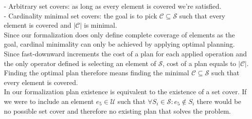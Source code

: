 \documentclass[11pt,a4paper]{article}
\begin{document}
- Arbitrary set covers: as long as every element is covered we're satisfied.\\
- Cardinality minimal set covers: the goal is to pick $\mathcal{C} \subseteq \mathcal{S}$ such that every element is covered and $|\mathcal{C}|$ is minimal.\\
Since our formalization does only define complete coverage of elements as the goal, cardinal minimality can only be achieved by applying optimal planning. Since fast-downward increments the cost of a plan for each applied operation and the only operator defined is selecting an element of $\mathcal{S}$, cost of a plan equals to $|\mathcal{C}|$. Finding the optimal plan therefore means finding the minimal $\mathcal{C} \subseteq \mathcal{S}$ such that every element is covered.\\
In our formalization plan existence is equivalent to the existence of a set cover. If we were to include an element $e_5 \in \mathcal{U}$ such that $\forall S_i \in \mathcal{S} : e_5 \notin S_i$ there would be no possible set cover and therefore no existing plan that solves the problem.
\end{document}
